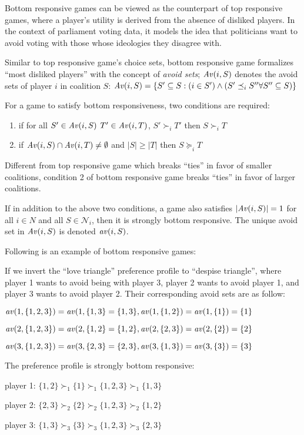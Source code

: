 Bottom responsive games can be viewed as the counterpart of top responsive games,
where a player's utility is derived from the absence of disliked players.
In the context of parliament voting data, it models the idea that politicians want
to avoid voting with those whose ideologies they disagree with.

Similar to top responsive game's choice sets, bottom responsive game formalizes
``most disliked players'' with the concept of \textit{avoid sets};
$\mathit{Av}(i, S)$ denotes the avoid sets of player $i$ in coalition $S$: $\mathit{Av}(i, S) =
\{S' \subseteq S: (i \in S') \wedge (S' \preceq_i S'' \forall S'' \subseteq S)\}$

For a game to satisfy bottom responsiveness, two conditions are required:

\begin{enumerate}
  \item if for all $S' \in \mathit{Av}(i, S)$ $T' \in \mathit{Av}(i, T)$, $ S' \succ_i T'$
    then $S \succ_i T$
  \item if $\mathit{Av}(i, S) \cap \mathit{Av}(i, T) \neq \emptyset$ and $|S| \geq |T|$
    then $S \succeq_i T$
\end{enumerate}

Different from top responsive game which breaks ``ties'' in favor of
smaller coalitions, condition 2 of bottom responsive game breaks ``ties'' in
favor of larger coalitions.

If in addition to the above two conditions, a game also satisfies
$|\mathit{Av}(i, S)| = 1$ for all $i \in N$ and all $S \in \mathcal{N}_i$,
then it is strongly bottom responsive. The unique avoid set in $\mathit{Av}(i, S)$
is denoted $\mathit{av}(i, S)$.

Following is an example of bottom responsive games:

\begin{example}
\label{example:bottom_responsive_pref}
  If we invert the ``love triangle'' preference profile to ``despise triangle'',
  where player 1 wants to avoid being with player 3,
  player 2 wants to avoid player 1, and player 3 wants to avoid player 2.
  Their corresponding avoid sets are as follow:

  $\mathit{av}(1, \{1, 2, 3\}) = \mathit{av}(1, \{1, 3\} = \{1, 3\},
   \mathit{av}(1, \{1, 2\}) = \mathit{av}(1, \{1\}) = \{1\}$

  $\mathit{av}(2, \{1, 2, 3\}) = \mathit{av}(2, \{1, 2\} = \{1, 2\},
   \mathit{av}(2, \{2, 3\}) = \mathit{av}(2, \{2\}) = \{2\}$

  $\mathit{av}(3, \{1, 2, 3\}) = \mathit{av}(3, \{2, 3\} = \{2, 3\},
   \mathit{av}(3, \{1, 3\}) = \mathit{av}(3, \{3\}) = \{3\}$

  The preference profile is strongly bottom responsive:

  player 1: $\{1, 2\} \succ_1 \{1\} \succ_1 \{1, 2, 3\} \succ_1 \{1, 3\}$

  player 2: $\{2, 3\} \succ_2 \{2\} \succ_2 \{1, 2, 3\} \succ_2 \{1, 2\}$

  player 3: $\{1, 3\} \succ_3 \{3\} \succ_3 \{1, 2, 3\} \succ_3 \{2, 3\}$
\end{example}

